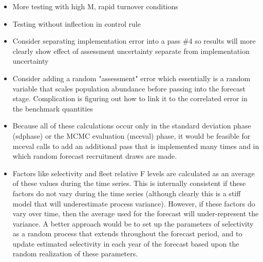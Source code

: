 \begin{itemize}
	\item More testing with high M, rapid turnover conditions
	\item Testing without inflection in control rule
	\item Consider separating implementation error into a pass \#4 so results will more clearly show effect of assessment uncertainty separate from implementation uncertainty
	\item 	Consider adding a random "assessment" error which essentially is a random variable that scales population abundance before passing into the forecast stage.  Complication is figuring out how to link it to the correlated error in the benchmark quantities
	\item Because all of these calculations occur only in the standard deviation phase (sdphase) or the MCMC evaluation (mceval) phase, it would be feasible for mceval calls to add an additional pass that is implemented many times and in which random forecast recruitment draws are made.
	\item Factors like selectivity and fleet relative F levels are calculated as an average of these values during the time series.  This is internally consistent if these factors do not vary during the time series (although clearly this is a stiff model that will underestimate process variance).  However, if these factors do vary over time, then the average used for the forecast will under-represent the variance.  A better approach would be to set up the parameters of selectivity as a random process that extends throughout the forecast period, and to update estimated selectivity in each year of the forecast based upon the random realization of these parameters.
\end{itemize}

	
